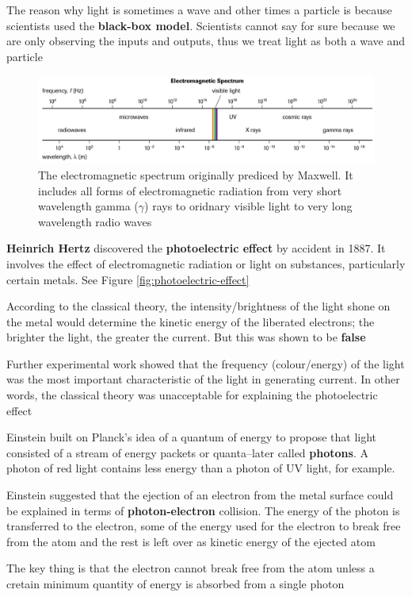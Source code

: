 \begin{important}
    The reason why light is sometimes a wave and other times a particle is because scientists
    used the \textbf{black-box model}. Scientists cannot say for sure because we are only observing
    the inputs and outputs, thus we treat light as both a wave and particle
\end{important}

\begin{figure}[ht!]
    \centering
    \includegraphics[width=\textwidth]{../figures/maxwell-electromagnetic-spectrum.png}
    \caption{The electromagnetic spectrum originally prediced by Maxwell. It includes all forms
        of electromagnetic radiation from very short wavelength gamma ($\gamma$) rays to oridnary
        visible light to very long wavelength radio waves}
    \label{fig:maxwell-electronagmetic-spectrum}
\end{figure}

\begin{bulleted-list}
    \item \textbf{Heinrich Hertz} discovered the \textbf{photoelectric effect} by accident in 1887. It
        involves the effect of electromagnetic radiation or light on substances, particularly 
        certain metals. See Figure \ref{fig:photoelectric-effect}
    \item According to the classical theory, the intensity/brightness of the light shone on
        the metal would determine the kinetic energy of the liberated electrons; the brighter
        the light, the greater the current. But this was shown to be \textbf{false}
    \item Further experimental work showed that the frequency (colour/energy) of the light was
        the most important characteristic of the light in generating current. In other words,
        the classical theory was unacceptable for explaining the photoelectric effect
    \item Einstein built on Planck's idea of a quantum of energy to propose that light consisted
        of a stream of energy packets or quanta--later called \textbf{photons}. A photon of red 
        light contains less energy than a photon of UV light, for example.
    \item Einstein suggested that the ejection of an electron from the metal surface could be 
        explained in terms of \textbf{photon-electron} collision. The energy of the photon
        is transferred to the electron, some of the energy used for the electron to break free
        from the atom and the rest is left over as kinetic energy of the ejected atom
    \item The key thing is that the electron cannot break free from the atom unless a cretain
        minimum quantity of energy is absorbed from a single photon
\end{bulleted-list}

